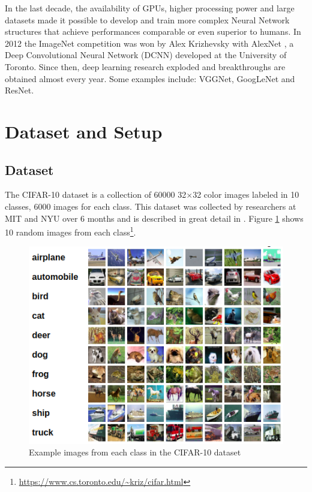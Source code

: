 \documentclass[conference]{IEEEtran}
\begin{document}
In the last decade, the availability of GPUs, higher processing power and large datasets made it possible to develop and train more complex Neural Network structures that achieve performances comparable or even superior to humans. In 2012 the ImageNet competition was won by Alex Krizhevsky with AlexNet \cite{krizhevsky2012imagenet}, a Deep Convolutional Neural Network (DCNN) developed at the University of Toronto. Since then, deep learning research exploded and  breakthroughs are obtained almost every year. Some examples include: VGGNet\cite{simonyan2014very}, GoogLeNet\cite{szegedy2015going} and ResNet\cite{he2016deep}.


\section{Dataset and Setup}
\label{section:datasets}

\subsection{Dataset}

The CIFAR-10 dataset is a collection of 60000 32$\times$32 color images labeled in 10 classes, 6000 images for each class. This dataset was collected by researchers at MIT and NYU over 6 months and is described in great detail in \cite{krizhevsky2009learning}. Figure \ref{fig:cifar10} shows 10 random images from each class\footnote{\url{https://www.cs.toronto.edu/~kriz/cifar.html}}.

\begin{figure}[]
\centering
\includegraphics[scale = 0.35]{figs/cifar10.png}
\caption{Example images from each class in the CIFAR-10 dataset}
\label{fig:cifar10}
\end{figure}
\end{document}
